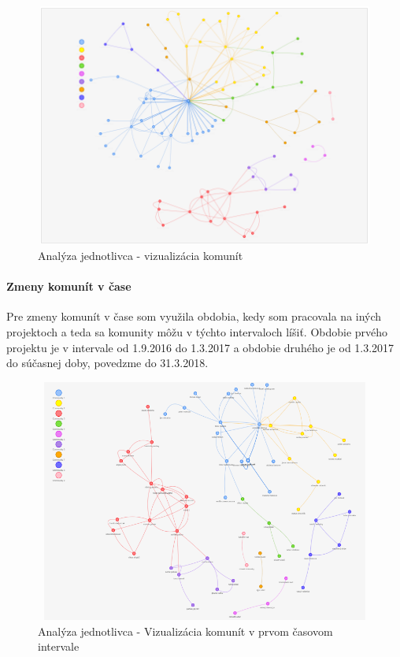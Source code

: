 \documentclass[slovak,master,public,dept460,male,cpdeclaration,oneside]{diploma}
\begin{document}
\begin{figure}[H]
\centering
\includegraphics[width=12cm, height=8cm]{figures/analyza_jednotlivca_komunity}
\caption{Analýza jednotlivca - vizualizácia komunít}
\label{analyza_jednotlivca_stat}
\end{figure}


\paragraph{Zmeny komunít v čase}

Pre zmeny komunít v čase som využila obdobia, kedy som pracovala na iných projektoch a teda sa komunity môžu v týchto intervaloch líšiť. Obdobie prvého projektu je v intervale od 1.9.2016 do 1.3.2017 a obdobie druhého je od 1.3.2017 do súčasnej doby, povedzme do 31.3.2018. 


\begin{figure}[H]
\centering
\includegraphics[width=12cm, height=8cm]{figures/analyza_jednotlivca_komunity_firstInt}
\caption{Analýza jednotlivca - Vizualizácia komunít v prvom časovom intervale}
\label{analyza_jednotlivca_komunity_firstInt}
\end{figure}
\end{document}
